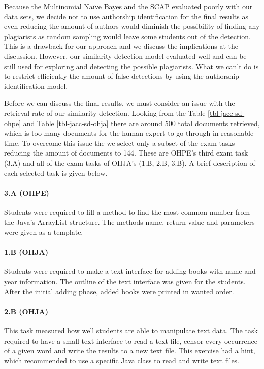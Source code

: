 Because the Multinomial Naïve Bayes and the SCAP evaluated poorly with our data sets, we decide not to use authorship identification for the final results as even reducing the amount of authors would diminish the possibility of finding any plagiarists as random sampling would leave some students out of the detection. This is a drawback for our approach and we discuss the implications at the discussion. However, our similarity detection model evaluated well and can be still used for exploring and detecting the possible plagiarists. What we can't do is to restrict efficiently the amount of false detections by using the authorship identification model.

Before we can discuss the final results, we must consider an issue with the retrieval rate of our similarity detection. Looking from the Table \ref{tbl-jacc-sd-ohpe} and Table \ref{tbl-jacc-sd-ohja} there are around 500 total documents retrieved, which is too many documents for the human expert to go through in reasonable time. To overcome this issue the we select only a subset of the exam tasks reducing the amount of documents to 144. These are OHPE's third exam task (3.A) and all of the exam tasks of OHJA's (1.B, 2.B, 3.B). A brief description of each selected task is given below.

\paragraph{3.A (OHPE)} Students were required to fill a method to find the most common number from the Java's ArrayList structure. The methods name, return value and parameters were given as a template. 

\paragraph{1.B (OHJA)} Students were required to make a text interface for adding books with name and year information. The outline of the text interface was given for the students. After the initial adding phase, added books were printed in wanted order.

\paragraph{2.B (OHJA)} This task measured how well students are able to manipulate text data. The task required to have a small text interface to read a text file, censor every occurrence of a given word and write the results to a new text file. This exercise had a hint, which recommended to use a specific Java class to read and write text files. 

